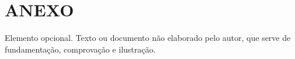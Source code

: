 \chapter*{ANEXO}
Elemento opcional. Texto ou documento não elaborado pelo autor, que serve de fundamentação, comprovação e ilustração.
